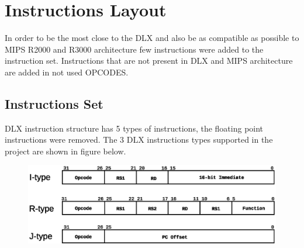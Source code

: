 \documentclass{article}
\begin{document}
  

    
  \newpage
  \section{Instructions Layout}
  In order to be the most close to the DLX and also be as compatible as possible to MIPS R2000 and R3000 architecture few instructions were added to the instruction set. Instructions that are not present in DLX and MIPS architecture are added in not used OPCODES.
  \label{sec:instruction_layout}

  \subsection{Instructions Set}
  DLX instruction structure has 5 types of instructions, the floating point instructions were removed. The 3 DLX instructions types supported in the project are shown in figure below.
  
  \begin{figure}[H]
    \centering
    \includegraphics[width=\linewidth]{pictures/instruction_set.eps}
  \end{figure} 
  
\end{document}
